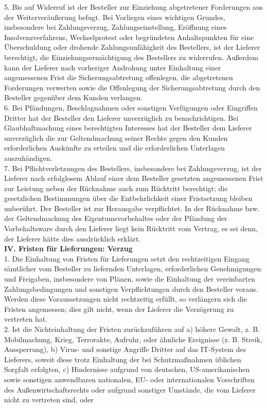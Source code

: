 \begin{multicols}{2}
\begin{scriptsize}
	5. Bis auf Widerruf ist der Besteller zur Einziehung abgetretener Forderungen aus der Weiterveräußerung befugt. Bei Vorliegen eines wichtigen Grundes, insbesondere bei Zahlungsverzug, Zahlungseinstellung, Eröffnung eines Insolvenzverfahrens, Wechselprotest oder begründeten Anhaltspunkten für eine Überschuldung oder drohende Zahlungsunfähigkeit des Bestellers, ist der Lieferer berechtigt, die Einziehungsermächtigung des Bestellers zu widerrufen. Außerdem kann der Lieferer nach vorheriger Androhung unter Einhaltung einer angemessenen Frist die Sicherungsabtretung offenlegen, die abgetretenen Forderungen verwerten sowie die Offenlegung der Sicherungsabtretung durch den Besteller gegenüber dem Kunden verlangen.\\
	6. Bei Pfändungen, Beschlagnahmen oder sonstigen Verfügungen oder Eingriffen Dritter hat der Besteller den Lieferer unverzüglich zu benachrichtigen. Bei Glaubhaftmachung eines berechtigten Interesses hat der Besteller dem Lieferer unverzüglich die zur Geltendmachung seiner Rechte gegen den Kunden erforderlichen Auskünfte zu erteilen und die erforderlichen Unterlagen auszuhändigen.\\
	7. Bei Pflichtverletzungen des Bestellers, insbesondere bei Zahlungsverzug, ist der Lieferer nach erfolglosem Ablauf einer dem Besteller gesetzten angemessenen Frist zur Leistung neben der Rücknahme auch zum Rücktritt berechtigt; die gesetzlichen Bestimmungen über die Entbehrlichkeit einer Fristsetzung bleiben unberührt. Der Besteller ist zur Herausgabe verpflichtet. In der Rücknahme bzw. der Geltendmachung des Eigentumsvorbehaltes oder der Pfändung der Vorbehaltsware durch den Lieferer liegt kein Rücktritt vom Vertrag, es sei denn, der Lieferer hätte dies ausdrücklich erklärt.\\
	\textbf{IV. Fristen für Lieferungen: Verzug}\\
	1. Die Einhaltung von Fristen für Lieferungen setzt den rechtzeitigen Eingang sämtlicher vom Besteller zu liefernden Unterlagen, erforderlichen Genehmigungen und Freigaben, insbesondere von Plänen, sowie die Einhaltung der vereinbarten Zahlungsbedingungen und sonstigen Verpflichtungen durch den Besteller voraus. Werden diese Voraussetzungen nicht rechtzeitig erfüllt, so verlängern sich die Fristen angemessen; dies gilt nicht, wenn der Lieferer die Verzögerung zu vertreten hat.\\
	2. Ist die Nichteinhaltung der Fristen zurückzuführen auf a) höhere Gewalt, z. B. Mobilmachung, Krieg, Terrorakte, Aufruhr, oder ähnliche Ereignisse (z. B. Streik, Aussperrung), b) Virus- und sonstige Angriffe Dritter auf das IT-System des Lieferers, soweit diese trotz Einhaltung der bei Schutzmaßnahmen üblichen Sorgfalt erfolgten, c) Hindernisse aufgrund von deutschen, US-amerikanischen sowie sonstigen anwendbaren nationalen, EU- oder internationalen Vorschriften des Außenwirtschaftsrechts oder aufgrund sonstiger Umstände, die vom Lieferer nicht zu vertreten sind, oder\\

\end{scriptsize}
\end{multicols}
